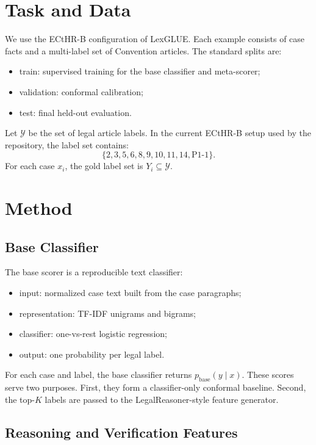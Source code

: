 \documentclass[11pt]{article}
\begin{document}
\section{Task and Data}

We use the ECtHR-B configuration of LexGLUE. Each example consists of case facts and a multi-label set of Convention articles. The standard splits are:
\begin{itemize}
  \item train: supervised training for the base classifier and meta-scorer;
  \item validation: conformal calibration;
  \item test: final held-out evaluation.
\end{itemize}

Let $\mathcal{Y}$ be the set of legal article labels. In the current ECtHR-B setup used by the repository, the label set contains:
\[
\{2,3,5,6,8,9,10,11,14,\mathrm{P1\mbox{-}1}\}.
\]
For each case $x_i$, the gold label set is $Y_i \subseteq \mathcal{Y}$.

\section{Method}

\subsection{Base Classifier}

The base scorer is a reproducible text classifier:
\begin{itemize}
  \item input: normalized case text built from the case paragraphs;
  \item representation: TF-IDF unigrams and bigrams;
  \item classifier: one-vs-rest logistic regression;
  \item output: one probability per legal label.
\end{itemize}

For each case and label, the base classifier returns $p_{\mathrm{base}}(y \mid x)$. These scores serve two purposes. First, they form a classifier-only conformal baseline. Second, the top-$K$ labels are passed to the LegalReasoner-style feature generator.

\subsection{Reasoning and Verification Features}
\end{document}
